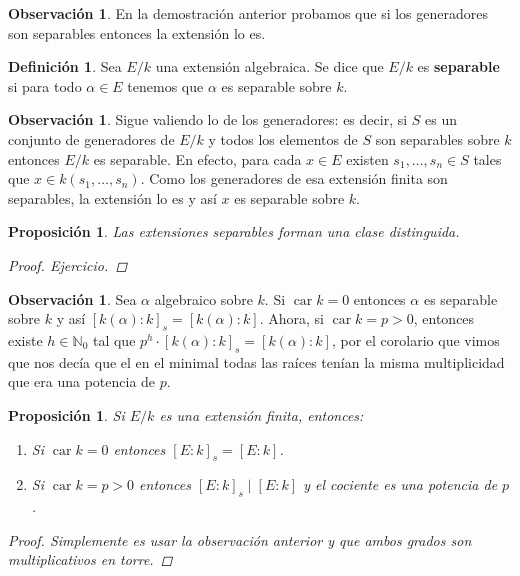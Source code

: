 \documentclass[12pt]{book}
\newtheorem{prop}[teo]{Proposición}
\theoremstyle{definition}
\newtheorem{obs}[teo]{Observación}
\newtheorem{defn}[teo]{Definición}
\newcommand{\NN}{\mathbb{N}}
\DeclareMathOperator{\car}{car}
\begin{document}
\begin{obs}
En la demostración anterior probamos que si los generadores son separables entonces la extensión lo es.
\end{obs}

\begin{defn}
Sea $E/k$ una extensión algebraica. Se dice que $E/k$ es \textbf{separable} si para todo $\alpha\in E$ tenemos que $\alpha$ es separable sobre $k$.
\end{defn}

\begin{obs}
Sigue valiendo lo de los generadores: es decir, si $S$ es un conjunto de generadores de $E/k$ y todos los elementos de $S$ son separables sobre $k$ entonces $E/k$ es separable. En efecto, para cada $x\in E$ existen $s_1,\ldots , s_n\in S$ tales que $x\in k(s_1,\ldots , s_n)$. Como los generadores de esa extensión finita son separables, la extensión lo es y así $x$ es separable sobre $k$.
\end{obs}

\begin{prop}
Las extensiones separables forman una clase distinguida.
\begin{proof}
Ejercicio.
\end{proof}
\end{prop}

\begin{obs}
Sea $\alpha$ algebraico sobre $k$. Si $\car k=0$ entonces $\alpha$ es separable sobre $k$ y así $[k(\alpha):k]_s = [k(\alpha):k]$. Ahora, si $\car k = p>0$, entonces existe $h\in\NN_0$ tal que $p^h\cdot [k(\alpha):k]_s = [k(\alpha):k]$, por el corolario que vimos que nos decía que el en el minimal todas las raíces tenían la misma multiplicidad que era una potencia de $p$.
\end{obs}

\begin{prop}
Si $E/k$ es una extensión finita, entonces:
\begin{enumerate}
\item Si $\car k =0$ entonces $[E:k]_s = [E:k]$.
\item Si $\car k = p>0$ entonces $[E:k]_s \mid [E:k]$ y el cociente es una potencia de $p$.
\end{enumerate}
\begin{proof}
Simplemente es usar la observación anterior y que ambos grados son multiplicativos en torre.
\end{proof}
\end{prop}
\end{document}
